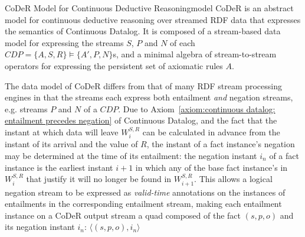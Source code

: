 \begin{nestedsection}{CoDeR Model for Continuous Deductive Reasoning}{model}
	CoDeR is an abstract model for continuous deductive reasoning over streamed RDF data that expresses the semantics of Continuous Datalog.
	It is composed of a stream-based data model for expressing the streams $S$, $P$ and $N$ of each ${CDP = \{A,S,R\} \vDash \{A',P,N\}}$s, and a minimal algebra of stream-to-stream operators for expressing the persistent set of axiomatic rules $A$.

	The data model of CoDeR differs from that of many RDF stream processing engines \citep{CQELS,EP-SPARQL} in that the streams each express both entailment \emph{and} negation streams, e.g. streams $P$ and $N$ of a ${CDP}$.
	Due to Axiom~\ref{axiom:continuous datalog: entailment precedes negation} of Continuous Datalog, and the fact that the instant at which data will leave $W^{S,R}_{i}$ can be calculated in advance from the instant of its arrival and the value of $R$, the instant of a fact instance's negation may be determined at the time of its entailment:
	the negation instant $i_{n}$ of a fact instance is the earliest instant ${i + 1}$ in which any of the base fact instance's in $W^{S,R}_{i}$ that justify it will no longer be found in $W^{S,R}_{i+1}$.
	This allows a logical negation stream to be expressed as \emph{valid-time} annotations \citep{TA-SPARQL,sparkwave} on the instances of entailments in the corresponding entailment stream, making each entailment instance on a CoDeR output stream a quad composed of the fact ${(s,p,o)}$ and its negation instant $i_{n}$: ${\langle (s,p,o),i_{n} \rangle}$




\end{nestedsection}